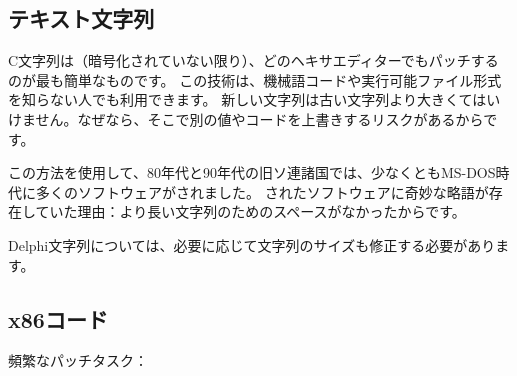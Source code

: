 
\subsection{テキスト文字列}

C文字列は（暗号化されていない限り）、どのヘキサエディターでもパッチするのが最も簡単なものです。
この技術は、機械語コードや実行可能ファイル形式を知らない人でも利用できます。
新しい文字列は古い文字列より大きくてはいけません。なぜなら、そこで別の値やコードを上書きするリスクがあるからです。

この方法を使用して、80年代と90年代の旧ソ連諸国では、少なくともMS-DOS時代に多くのソフトウェアがされました。
されたソフトウェアに奇妙な略語が存在していた理由：より長い文字列のためのスペースがなかったからです。


Delphi文字列については、必要に応じて文字列のサイズも修正する必要があります。

\subsection{x86コード}
\label{x86_patching}

頻繁なパッチタスク：

